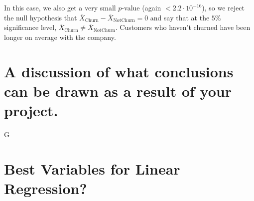 \documentclass[man, floatsintext]{apa6}
\begin{document}
\hspace{0.5mm}

In this case, we also get a very small $p$-value (again $< 2.2 \cdot 10^{-16}$), so we reject the null hypothesis that  $\overline{X}_{\text{Churn}} - \overline{X}_{\text{NotChurn}} = 0$ and say that at the $5 \%$ significance level, $\overline{X}_{\text{Churn}} \neq \overline{X}_{\text{NotChurn}}$. Customers who haven't churned have been longer on average with the company. 


\section{A discussion of what conclusions can be drawn as a result of your project.}
G
\appendix
\section{Best Variables for Linear Regression?}
\newpage
\printbibliography
\end{document}
